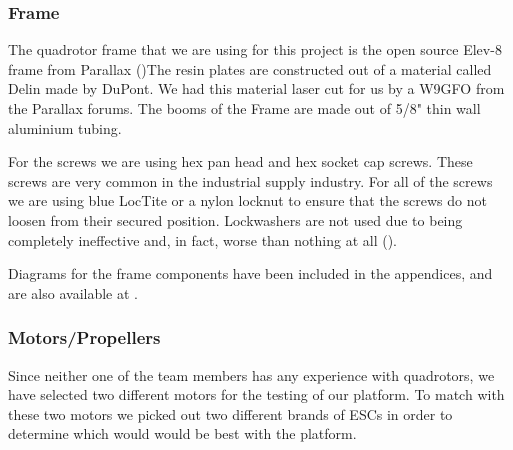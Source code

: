 \documentclass{article}
\numberwithin{equation}{section} %
\begin{document}

\subsubsection{Frame}
The quadrotor frame that we are using for this project is the open source Elev-8 frame from Parallax (\cite{elev8_frame})The resin plates are constructed out of a material called Delin\textregistered\cite{dupontdelin} made by DuPont\texttrademark. We had this material laser cut for us by a W9GFO from the Parallax forums. The booms of the Frame are made out of 5/8" thin wall aluminium tubing.

For the screws we are using hex pan head and hex socket cap screws. These screws are very common in the industrial supply industry. For all of the screws we are using blue LocTite or a nylon locknut to ensure that the screws do not loosen from their secured position. Lockwashers are not used due to being completely ineffective and, in fact, worse than nothing at all (\cite{vibration_loose}).

Diagrams for the frame components have been included in the appendices, and are also available at \cite{anzhelka_code}.

\subsubsection{Motors/Propellers}

Since neither one of the team members has any experience with quadrotors, we have selected two different motors for the testing of our platform. To match with these two motors we picked out two different brands of ESCs in order to determine which would would be best with the platform.
\end{document}
